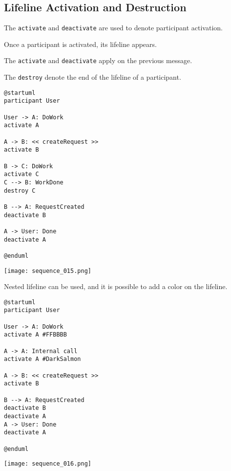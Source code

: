 \newpage \subsection{Lifeline Activation and Destruction}

\begin{description}
\item The \texttt{activate} and \texttt{deactivate} are used to denote
participant activation.
\item Once a participant is activated, its lifeline appears.
\item The \texttt{activate} and \texttt{deactivate} apply on the previous
message.
\item The \texttt{destroy} denote the end of the lifeline of a participant.
\end{description}

\begin{lstlisting}
@startuml
participant User

User -> A: DoWork
activate A

A -> B: << createRequest >>
activate B

B -> C: DoWork
activate C
C --> B: WorkDone
destroy C

B --> A: RequestCreated
deactivate B

A -> User: Done
deactivate A

@enduml
\end{lstlisting}
\begin{center}
\texttt{[image: sequence\_015.png]}
\end{center}

\newpage
Nested lifeline can be used, and it is possible to add a color on the lifeline.

\begin{lstlisting}
@startuml
participant User

User -> A: DoWork
activate A #FFBBBB

A -> A: Internal call
activate A #DarkSalmon

A -> B: << createRequest >>
activate B

B --> A: RequestCreated
deactivate B
deactivate A
A -> User: Done
deactivate A

@enduml
\end{lstlisting}
\begin{center}
\texttt{[image: sequence\_016.png]}
\end{center}

